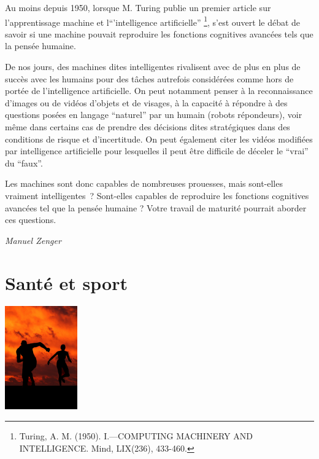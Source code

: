 \documentclass[
  10pt,
  french,
  a5paper,
  openany]{book}
\newenvironment{signature}{\begin{flushright}}{\end{flushright}}
\begin{document}
Au moins depuis 1950, lorsque M. Turing publie un premier article sur l'apprentissage machine et l``'intelligence artificielle'' \footnote{Turing, A. M. (1950). I.---COMPUTING MACHINERY AND INTELLIGENCE. Mind, LIX(236), 433-460.}, s'est ouvert le débat de savoir si une machine pouvait reproduire les fonctions cognitives avancées tels que la pensée humaine.

De nos jours, des machines dites intelligentes rivalisent avec de plus en plus de succès avec les humains pour des tâches autrefois considérées comme hors de portée de l'intelligence artificielle. On peut notamment penser à la reconnaissance d'images ou de vidéos d'objets et de visages, à la capacité à répondre à des questions posées en langage ``naturel'' par un humain (robots répondeurs), voir même dans certains cas de prendre des décisions dites stratégiques dans des conditions de risque et d'incertitude. On peut également citer les vidéos modifiées par intelligence artificielle pour lesquelles il peut être difficile de déceler le ``vrai'' du ``faux''.

Les machines sont donc capables de nombreuses prouesses, mais sont-elles vraiment intelligentes~? Sont-elles capables de reproduire les fonctions cognitives avancées tel que la pensée humaine ? Votre travail de maturité pourrait aborder ces questions.

\begin{signature}
\emph{Manuel Zenger}

\end{signature}

\hypertarget{santuxe9-et-sport}{%
\chapter{Santé et sport}\label{santuxe9-et-sport}}

\begin{center}
\includegraphics[width=\textwidth,height=12em]{images/sante-sport.jpg}

\end{center}
\end{document}
